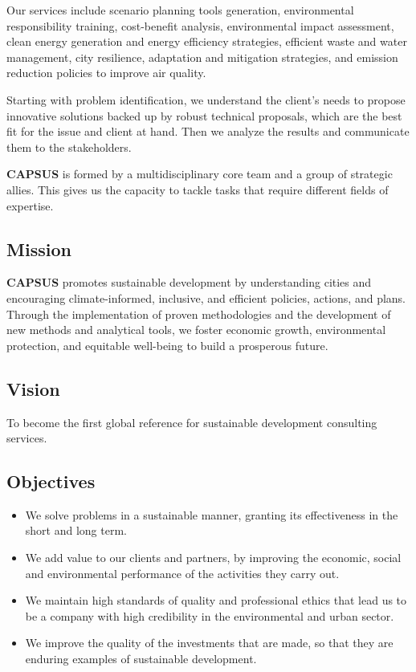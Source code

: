\documentclass[
	a4paper,
	12pt,
	unnumberedsections,
]{CSSullivanBusinessReport}
\begin{document}
Our services include scenario planning tools generation, environmental responsibility training, cost-benefit analysis, environmental impact assessment, clean energy generation and energy efficiency strategies, efficient waste and water management, city resilience, adaptation and mitigation strategies, and emission reduction policies to improve air quality.

Starting with problem identification, we understand the client’s needs to propose innovative solutions backed up by robust technical proposals, which are the best fit for the issue and client at hand. Then we analyze the results and communicate them to the stakeholders.

\textbf{CAPSUS} is formed by a multidisciplinary core team and a group of strategic allies. This gives us the capacity to tackle tasks that require different fields of expertise.

\subsection{Mission}
\textbf{CAPSUS} promotes sustainable development by understanding cities and encouraging climate-informed, inclusive, and efficient policies, actions, and plans. Through the implementation of proven methodologies and the development of new methods and analytical tools, we foster economic growth, environmental protection, and equitable well-being to build a prosperous future.

\subsection{Vision}
To become the first global reference for sustainable development consulting services.

\subsection{Objectives}
\begin{itemize}
\item We solve problems in a sustainable manner, granting its effectiveness in the short and long term.
\item We add value to our clients and partners, by improving the economic, social and environmental performance of the activities they carry out.
\item We maintain high standards of quality and professional ethics that lead us to be a company with high credibility in the environmental and urban sector.
\item We improve the quality of the investments that are made, so that they are enduring examples of sustainable development.


\end{itemize}
\end{document}
